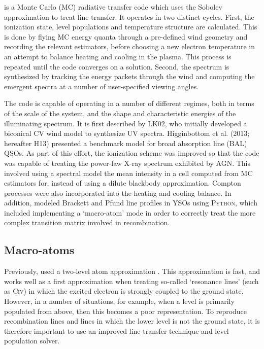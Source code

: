 \documentclass[preprint, a4paper, 11pt]{aastex}
\begin{document}
\py is a Monte Carlo (MC) radiative transfer code which uses
the Sobolev approximation to treat line transfer. It operates 
in two distinct cycles. First, the ionization state, level populations
and temperature structure are calculated. This is done by
flying MC energy quanta through a pre-defined wind geometry and recording
the relevant estimators, before choosing  a new electron temperature 
in an attempt to balance heating and cooling in the plasma.
This process is repeated until the code converges on a 
solution. Second, the spectrum is synthesized by tracking
the energy packets through the wind and computing the 
emergent spectra at a number of user-specified viewing angles.

The code is capable of operating in a number of different
regimes, both in terms of the scale of the system, and the 
shape and characteristic energies of the illuminating spectrum. It is 
first described by LK02, who initially developed a biconical CV 
wind model to synthesize UV spectra. 
Higginbottom et al.\nocite{higginbottom2013} (2013; hereafter H13) presented a 
benchmark model for broad absorption line (BAL) QSOs.
As part of this effort, the ionization scheme was improved so that 
the code was capable of treating the power-law X-ray spectrum
exhibited by AGN.
This involved using a spectral model the mean intensity in a cell
computed from MC estimators for, instead of using a dilute blackbody
approximation. Compton processes
were also incorporated into the heating and cooling balance.
In addition, \cite[][SDL05]{simmacro2005} modeled
Brackett and Pfund line profiles in YSOs using \textsc{Python,} which included
implementing a `macro-atom' mode in order to correctly treat the more
complex transition matrix involved in recombination. 



\subsection{Macro-atoms}

Previously, \py used a two-level atom approximation \cite[see e.g.][]{mihalas}. This approximation is 
fast, and works well as a first approximation when treating so-called `resonance lines' (such as C\textsc{iv}) 
in which the excited electron is strongly coupled to the ground state.
However, in a number of situations, for example, when a level is primarily populated from above, then
this becomes a poor representation. 
To reproduce recombination lines and lines in which the lower level is not the ground state, 
it is therefore important to use an improved line transfer technique and level population solver.
\end{document}
